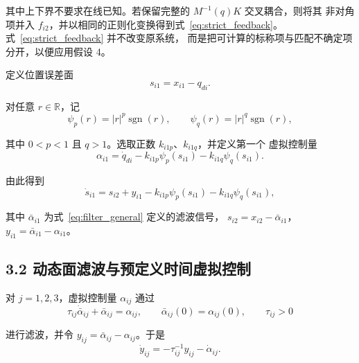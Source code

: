 \documentclass{article}
\begin{document}
其中上下界不要求在线已知。若保留完整的 $M^{-1}(q)K$ 交叉耦合，则将其
非对角项并入 $f_{i2}$，并以相同的正则化变换得到式~\eqref{eq:strict_feedback}。
式~\eqref{eq:strict_feedback} 并不改变原系统，
而是把可计算的标称项与匹配不确定项分开，以便应用假设 4。

定义位置误差面
\begin{equation}
 s_{i1}=x_{i1}-q_{di} .

 \tag{38}
\label{eq:s_i1}
\end{equation}

对任意 $r\in\mathbb{R}$，记
\begin{equation}
 \psi_{p}(r)=|r|^{p}\operatorname{sgn}(r),\qquad
 \psi_{q}(r)=|r|^{q}\operatorname{sgn}(r),

 \tag{39}
\label{eq:power_maps}
\end{equation}

其中 $0<p<1$ 且 $q>1$。选取正数 $k_{i1p}$、$k_{i1q}$，并定义第一个
虚拟控制量
\begin{equation}
 \alpha_{i1}=\dot q_{di}
 -k_{i1p}\psi_p(s_{i1})
 -k_{i1q}\psi_q(s_{i1}).

 \tag{40}
\label{eq:alpha_i1}
\end{equation}

由此得到
\begin{equation}
 \dot s_{i1}=s_{i2}+y_{i1}
 -k_{i1p}\psi_p(s_{i1})-k_{i1q}\psi_q(s_{i1}),

 \tag{41}
\label{eq:s_i1_dot}
\end{equation}

其中 $\bar\alpha_{i1}$ 为式~\eqref{eq:filter_general} 定义的滤波信号，
$s_{i2}=x_{i2}-\bar\alpha_{i1}$，$y_{i1}=\bar\alpha_{i1}-\alpha_{i1}$。

\subsection{3.2 动态面滤波与预定义时间虚拟控制}
\label{subsec:virtual_controls}

对 $j=1,2,3$，虚拟控制量 $\alpha_{ij}$ 通过
\begin{equation}
 \tau_{ij}\dot{\bar\alpha}_{ij}+\bar\alpha_{ij}=\alpha_{ij},
 \qquad \bar\alpha_{ij}(0)=\alpha_{ij}(0),
 \qquad \tau_{ij}>0

 \tag{42}
\label{eq:filter_general}
\end{equation}

进行滤波，并令 $y_{ij}=\bar\alpha_{ij}-\alpha_{ij}$。于是
\begin{equation}
 \dot y_{ij}=-\tau_{ij}^{-1}y_{ij}-\dot\alpha_{ij} .

 \tag{43}
\label{eq:filter_error_dynamic}
\end{equation}
\end{document}
